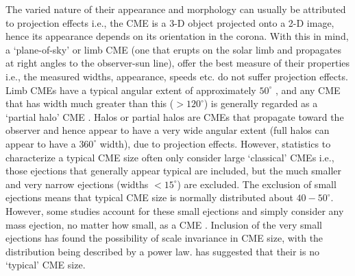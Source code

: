 The varied nature of their appearance and morphology can usually be attributed to projection effects \citep{burk2004} i.e., the CME is a 3-D object projected onto a 2-D image, hence its appearance depends on its orientation in the corona. With this in mind, a `plane-of-sky' or limb CME (one that erupts on the solar limb and propagates at right angles to the observer-sun line), offer the best measure of their properties i.e., the measured widths, appearance, speeds etc. do not suffer projection effects. Limb CMEs have a typical angular extent of approximately $50^{\circ}$ \citep{burk2004}, and any CME that has width much greater than this ($>120^{\circ}$) is generally regarded as a `partial halo' CME \citep{yashiro2004}. Halos or partial halos are CMEs that propagate toward the observer and hence appear to have a very wide angular extent (full halos can appear to have a $360^{\circ}$ width), due to projection effects. However, statistics to characterize a typical CME size often only consider large `classical' CMEs i.e., those ejections that generally appear typical are included, but the much smaller and very narrow ejections (widths $<15^{\circ}$) are excluded. The exclusion of small ejections means that typical CME size is normally distributed about $40-50^{\circ}$. However, some studies account for these small ejections and simply consider any mass ejection, no matter how small, as a CME \citep{robb2009}. Inclusion of the very small ejections has found the possibility of scale invariance in CME size, with the distribution being described by a power law. \citet{robb2009} has suggested that their is no \textquoteleft typical' CME size.



